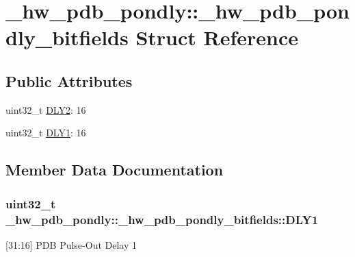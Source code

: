 \hypertarget{struct__hw__pdb__pondly_1_1__hw__pdb__pondly__bitfields}{}\section{\+\_\+hw\+\_\+pdb\+\_\+pondly\+:\+:\+\_\+hw\+\_\+pdb\+\_\+pondly\+\_\+bitfields Struct Reference}
\label{struct__hw__pdb__pondly_1_1__hw__pdb__pondly__bitfields}
\subsection*{Public Attributes}
\begin{DoxyCompactItemize}
\item 
uint32\+\_\+t \hyperlink{struct__hw__pdb__pondly_1_1__hw__pdb__pondly__bitfields_a38220909a6637d25e4f78e20e28314a4}{D\+L\+Y2}\+: 16
\item 
uint32\+\_\+t \hyperlink{struct__hw__pdb__pondly_1_1__hw__pdb__pondly__bitfields_a34d2d5c609ff14e3caa6165c04cca8b3}{D\+L\+Y1}\+: 16
\end{DoxyCompactItemize}


\subsection{Member Data Documentation}
\subsubsection[{\texorpdfstring{D\+L\+Y1}{DLY1}}]{\setlength{\rightskip}{0pt plus 5cm}uint32\+\_\+t \+\_\+hw\+\_\+pdb\+\_\+pondly\+::\+\_\+hw\+\_\+pdb\+\_\+pondly\+\_\+bitfields\+::\+D\+L\+Y1}\hypertarget{struct__hw__pdb__pondly_1_1__hw__pdb__pondly__bitfields_a34d2d5c609ff14e3caa6165c04cca8b3}{}\label{struct__hw__pdb__pondly_1_1__hw__pdb__pondly__bitfields_a34d2d5c609ff14e3caa6165c04cca8b3}
\mbox{[}31\+:16\mbox{]} P\+DB Pulse-\/\+Out Delay 1 

